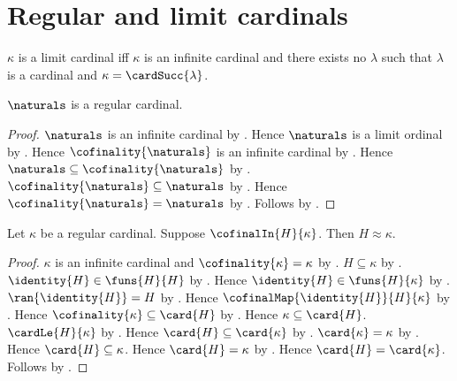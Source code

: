 \section{Regular and limit cardinals}




\begin{definition}\label{limit_cardinal}
    $\kappa$ is a limit cardinal iff $\kappa$ is an infinite cardinal and
        there exists no $\lambda$ such that $\lambda$ is a cardinal and
        $\kappa=\cardSucc{\lambda}$.
\end{definition}

\begin{theorem}\label{naturals_are_regular}
    $\naturals$ is a regular cardinal.
\end{theorem}
\begin{proof}
    $\naturals$ is an infinite cardinal
        by .
    Hence $\naturals$ is a limit ordinal
        by .
    Hence $\cofinality{\naturals}$ is an infinite cardinal
        by .
    Hence $\naturals\subseteq\cofinality{\naturals}$
        by .
    $\cofinality{\naturals}\subseteq\naturals$
        by .
    Hence $\cofinality{\naturals}=\naturals$
        by .
    Follows by .
\end{proof}

\begin{theorem}\label{cofinal_subset_equinumerous_regular_cardinal}
    Let $\kappa$ be a regular cardinal.
    Suppose $\cofinalIn{H}{\kappa}$.
    Then $H\approx\kappa$.
\end{theorem}
\begin{proof}
    $\kappa$ is an infinite cardinal and
        $\cofinality{\kappa}=\kappa$ by .
    $H\subseteq\kappa$ by .
    $\identity{H}\in\funs{H}{H}$ by .
    Hence $\identity{H}\in\funs{H}{\kappa}$
        by .
    $\ran{\identity{H}}=H$ by .
    Hence $\cofinalMap{\identity{H}}{H}{\kappa}$
        by .
    Hence $\cofinality{\kappa}\subseteq\card{H}$
        by .
    Hence $\kappa\subseteq\card{H}$.
    $\cardLe{H}{\kappa}$ by .
    Hence $\card{H}\subseteq\card{\kappa}$
        by .
    $\card{\kappa}=\kappa$ by .
    Hence $\card{H}\subseteq\kappa$.
    Hence $\card{H}=\kappa$ by .
    Hence $\card{H}=\card{\kappa}$.
    Follows by .
\end{proof}

